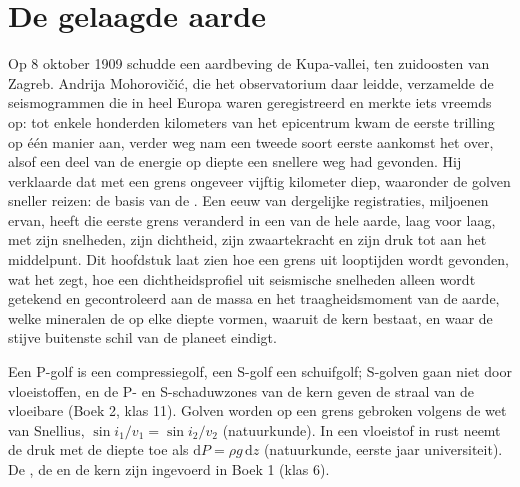 \chapter{De gelaagde aarde}\label{ch:b1:layered-earth}

Op 8 oktober 1909 schudde een aardbeving de Kupa-vallei, ten zuidoosten van Zagreb.
Andrija Mohorovičić, die het
observatorium daar leidde, verzamelde de seismogrammen die in heel Europa waren geregistreerd en merkte iets vreemds op:
tot enkele honderden kilometers van het epicentrum kwam de eerste trilling op één manier aan, verder weg nam een tweede
soort eerste aankomst het over, alsof een deel van de energie op diepte een snellere weg had gevonden. Hij verklaarde dat
met een grens ongeveer vijftig kilometer diep, waaronder de golven sneller reizen: de basis van de . Een eeuw van
dergelijke registraties, miljoenen ervan, heeft die eerste grens veranderd in een  van de hele aarde,
laag voor laag, met zijn snelheden, zijn dichtheid, zijn zwaartekracht en zijn druk tot aan het middelpunt. Dit hoofdstuk
laat zien hoe een grens uit looptijden wordt gevonden, wat het  zegt, hoe een dichtheidsprofiel uit
seismische snelheden alleen wordt getekend en gecontroleerd aan de massa en het traagheidsmoment van de aarde, welke
mineralen de  op elke diepte vormen, waaruit de kern bestaat, en waar de stijve buitenste schil van de planeet
eindigt.

\begin{recall}
Een P-golf is een compressiegolf, een S-golf een schuifgolf; S-golven gaan niet door vloeistoffen, en de P- en S-schaduwzones
van de kern geven de straal van de vloeibare  (Boek 2, klas 11). Golven worden op een grens gebroken volgens de wet van
Snellius, $\sin i_1/v_1 = \sin i_2/v_2$ (natuurkunde). In een vloeistof in rust neemt de druk met de diepte toe als
$\mathrm dP = \rho g\,\mathrm dz$ (natuurkunde, eerste jaar universiteit). De , de  en de kern zijn ingevoerd in
Boek 1 (klas 6).
\end{recall}

